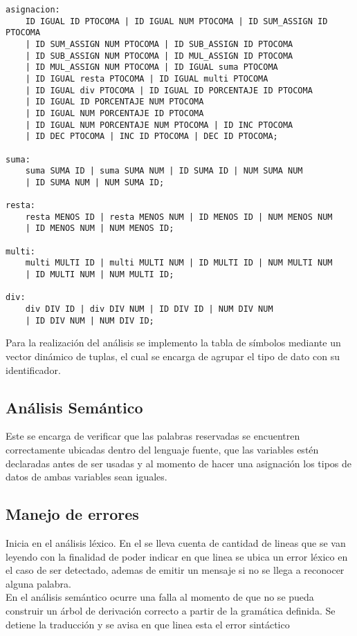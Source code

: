 \documentclass[aspectratio=169]{article}
\begin{document}
\begin{lstlisting}
asignacion:
	ID IGUAL ID PTOCOMA | ID IGUAL NUM PTOCOMA | ID SUM_ASSIGN ID PTOCOMA
	| ID SUM_ASSIGN NUM PTOCOMA | ID SUB_ASSIGN ID PTOCOMA
	| ID SUB_ASSIGN NUM PTOCOMA | ID MUL_ASSIGN ID PTOCOMA
	| ID MUL_ASSIGN NUM PTOCOMA | ID IGUAL suma PTOCOMA
	| ID IGUAL resta PTOCOMA | ID IGUAL multi PTOCOMA
	| ID IGUAL div PTOCOMA | ID IGUAL ID PORCENTAJE ID PTOCOMA
	| ID IGUAL ID PORCENTAJE NUM PTOCOMA
	| ID IGUAL NUM PORCENTAJE ID PTOCOMA
	| ID IGUAL NUM PORCENTAJE NUM PTOCOMA | ID INC PTOCOMA
	| ID DEC PTOCOMA | INC ID PTOCOMA | DEC ID PTOCOMA;

suma:
	suma SUMA ID | suma SUMA NUM | ID SUMA ID | NUM SUMA NUM
	| ID SUMA NUM | NUM SUMA ID;

resta:
	resta MENOS ID | resta MENOS NUM | ID MENOS ID | NUM MENOS NUM
	| ID MENOS NUM | NUM MENOS ID;

multi:
	multi MULTI ID | multi MULTI NUM | ID MULTI ID | NUM MULTI NUM
	| ID MULTI NUM | NUM MULTI ID;

div:
	div DIV ID | div DIV NUM | ID DIV ID | NUM DIV NUM
	| ID DIV NUM | NUM DIV ID;

\end{lstlisting}

	Para la realizaci\'on del an\'alisis se implemento la tabla de símbolos mediante un vector dinámico de tuplas, el cual se encarga de agrupar el tipo de dato con su identificador.


\subsection{An\'alisis Sem\'antico}

	Este se encarga de verificar que las palabras reservadas se encuentren correctamente ubicadas dentro del lenguaje fuente, que las variables estén declaradas antes de ser usadas y al momento de hacer una asignación los tipos de datos  de ambas variables sean iguales.

\subsection{Manejo de errores}

	Inicia en el análisis léxico. En el se lleva cuenta de cantidad de lineas que se van leyendo con la finalidad de poder indicar en que linea se ubica un error léxico en el caso de ser detectado, ademas de emitir un mensaje si no se llega a reconocer alguna palabra.\\

	En el análisis semántico ocurre una falla al momento de que no se pueda construir un árbol de
	derivación correcto a partir de la gramática definida. Se detiene la traducción y se avisa en que linea esta el error sintáctico\\
\end{document}

